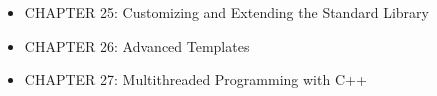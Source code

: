 \begin{itemize}
\item
CHAPTER 25: Customizing and Extending the Standard Library

\item
CHAPTER 26: Advanced Templates

\item
CHAPTER 27: Multithreaded Programming with C++
\end{itemize}